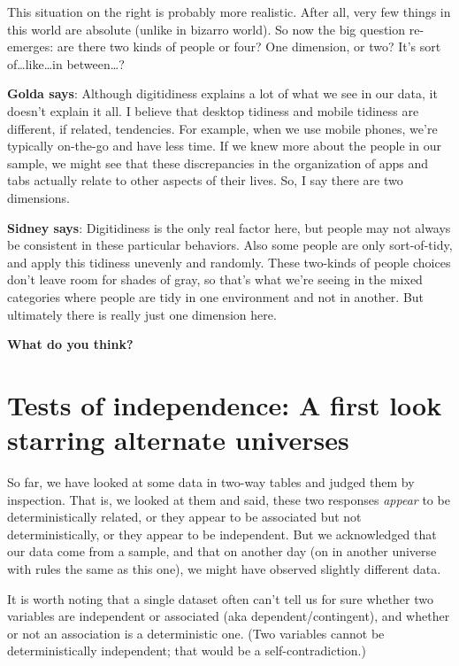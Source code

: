 \documentclass[
  openany]{book}
\begin{document}
This situation on the right is probably more realistic. After all, very few things in this world are absolute (unlike in bizarro world). So now the big question re-emerges: are there two kinds of people or four? One dimension, or two? It's sort of\ldots like\ldots in between\ldots?

\textbf{Golda says}: Although digitidiness explains a lot of what we see in our data, it doesn't explain it all. I believe that desktop tidiness and mobile tidiness are different, if related, tendencies. For example, when we use mobile phones, we're typically on-the-go and have less time. If we knew more about the people in our sample, we might see that these discrepancies in the organization of apps and tabs actually relate to other aspects of their lives. So, I say there are two dimensions.

\textbf{Sidney says}: Digitidiness is the only real factor here, but people may not always be consistent in these particular behaviors. Also some people are only sort-of-tidy, and apply this tidiness unevenly and randomly. These two-kinds of people choices don't leave room for shades of gray, so that's what we're seeing in the mixed categories where people are tidy in one environment and not in another. But ultimately there is really just one dimension here.

\textbf{What do you think?}

\hypertarget{test-indep}{%
\chapter{Tests of independence: A first look starring alternate universes}\label{test-indep}}

So far, we have looked at some data in two-way tables and judged them by inspection. That is, we looked at them and said, these two responses \emph{appear} to be deterministically related, or they appear to be associated but not deterministically, or they appear to be independent. But we acknowledged that our data come from a sample, and that on another day (on in another universe with rules the same as this one), we might have observed slightly different data.

It is worth noting that a single dataset often can't tell us for sure whether two variables are independent or associated (aka dependent/contingent), and whether or not an association is a deterministic one. (Two variables cannot be deterministically independent; that would be a self-contradiction.)
\end{document}
